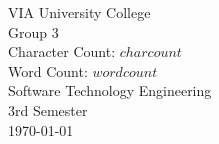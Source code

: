 \thispagestyle{empty}
\vspace*{0.15\textheight}
\begin{center}
    {\Large VIA University College}\\[2em]
    {\Large Group 3}\\[3em]
    {\large Character Count: $charcount$}\\[0.5em]
    {\large Word Count: $wordcount$}\\[2em]
    {\Large Software Technology Engineering}\\[1em]
    {\Large 3rd Semester}\\[1em]
    {\large \today}\\[1em]
\end{center}
\vfill
\clearpage